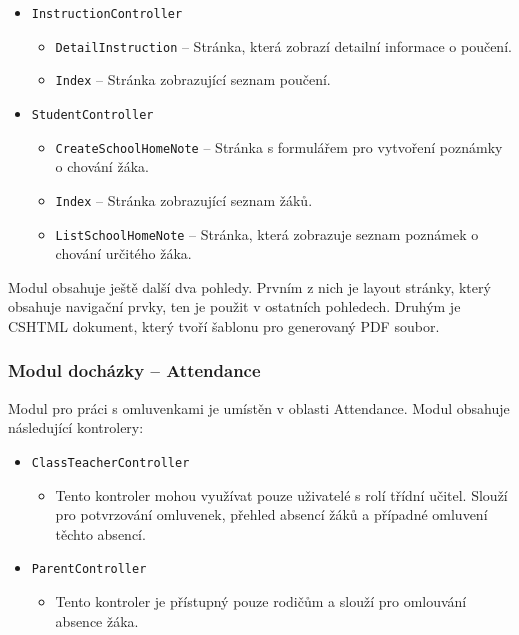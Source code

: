 \begin{itemize}
    \item \texttt{InstructionController}
    \begin{itemize}
        \item \texttt{DetailInstruction} -- Stránka, která zobrazí detailní informace o poučení.
        \item \texttt{Index} -- Stránka zobrazující seznam poučení.
    \end{itemize}
    
    \item \texttt{StudentController}
    \begin{itemize}
        \item \texttt{CreateSchoolHomeNote} -- Stránka s formulářem pro vytvoření poznámky o chování žáka.
        \item \texttt{Index} -- Stránka zobrazující seznam žáků.
        \item \texttt{ListSchoolHomeNote} -- Stránka, která zobrazuje seznam poznámek o chování určitého žáka.
    \end{itemize}
\end{itemize}

Modul obsahuje ještě další dva pohledy. Prvním z nich je layout stránky, který obsahuje navigační prvky, ten je použit v ostatních pohledech. Druhým je CSHTML dokument, který tvoří šablonu pro generovaný PDF soubor.

\subsubsection{Modul docházky -- Attendance}
Modul pro práci s omluvenkami je umístěn v oblasti Attendance. Modul obsahuje následující kontrolery:
\begin{itemize}
    \item \texttt{ClassTeacherController}
    \begin{itemize}
        \item Tento kontroler mohou využívat pouze uživatelé s rolí třídní učitel. Slouží pro potvrzování omluvenek, přehled absencí žáků a případné omluvení těchto absencí.
    \end{itemize}
    
    \item
    \texttt{ParentController}
    \begin{itemize}
        \item Tento kontroler je přístupný pouze rodičům a slouží pro omlouvání absence žáka.
    \end{itemize}
\end{itemize}

